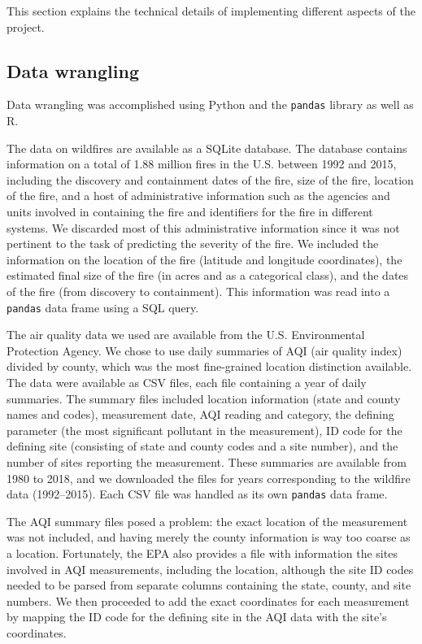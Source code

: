 \documentclass[a4paper,12pt]{article}
\begin{document}
This section explains the technical details of implementing different aspects of the project.

\subsection{Data wrangling}

Data wrangling was accomplished using Python and the \texttt{pandas} library as well as R.

The data on wildfires are available as a SQLite database. The database contains information on a total of 1.88 million fires in the U.S. between 1992 and 2015, including the discovery and containment dates of the fire, size of the fire, location of the fire, and a host of administrative information such as the agencies and units involved in containing the fire and identifiers for the fire in different systems. We discarded most of this administrative information since it was not pertinent to the task of predicting the severity of the fire. We included the information on the location of the fire (latitude and longitude coordinates), the estimated final size of the fire (in acres and as a categorical class), and the dates of the fire (from discovery to containment). This information was read into a \texttt{pandas} data frame using a SQL query.

The air quality data we used are available from the U.S. Environmental Protection Agency. We chose to use daily summaries of AQI (air quality index) divided by county, which was the most fine-grained location distinction available. The data were available as CSV files, each file containing a year of daily summaries. The summary files included location information (state and county names and codes), measurement date, AQI reading and category, the defining parameter (the most significant pollutant in the measurement), ID code for the defining site (consisting of state and county codes and a site number), and the number of sites reporting the measurement. These summaries are available from 1980 to 2018, and we downloaded the files for years corresponding to the wildfire data (1992–2015). Each CSV file was handled as its own \texttt{pandas} data frame.

The AQI summary files posed a problem: the exact location of the measurement was not included, and having merely the county information is way too coarse as a location. Fortunately, the EPA also provides a file with information the sites involved in AQI measurements, including the location, although the site ID codes needed to be parsed from separate columns containing the state, county, and site numbers. We then proceeded to add the exact coordinates for each measurement by mapping the ID code for the defining site in the AQI data with the site's coordinates.
\end{document}
